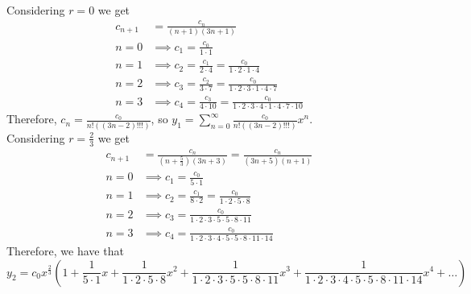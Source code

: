 \documentclass[notes]{subfiles}
\begin{document}
\begin{solution}
\begin{align*}
    \end{align*}
    Considering $r = 0$ we get
    \begin{align*}
        c_{n + 1} &= \frac{c_n}{(n + 1)(3n + 1)} \\
        n = 0 &\implies c_1 = \frac{c_0}{1\cdot 1} \\
        n = 1 &\implies c_2 = \frac{c_1}{2\cdot 4} = \frac{c_0}{1\cdot 2\cdot 1\cdot 4} \\
        n = 2 &\implies c_3 = \frac{c_2}{3\cdot 7} = \frac{c_0}{1\cdot 2\cdot 3\cdot 1\cdot 4\cdot 7} \\
        n = 3 &\implies c_4 = \frac{c_3}{4\cdot 10} = \frac{c_0}{1\cdot 2\cdot 3\cdot 4\cdot 1\cdot 4\cdot 7\cdot 10}
    \end{align*}
    Therefore, $c_n = \frac{c_0}{n!((3n - 2)!!!)}$, so $y_1 = \sum_{n = 0}^\infty \frac{c_0}{n!((3n - 2)!!!)}x^n$. \\
    Considering $r = \frac{2}{3}$ we get
    \begin{align*}
        c_{n + 1} &= \frac{c_n}{(n + \frac{5}{3})(3n + 3)} = \frac{c_n}{(3n + 5)(n + 1)} \\
        n = 0 &\implies c_1 = \frac{c_0}{5\cdot 1} \\
        n = 1 &\implies c_2 = \frac{c_1}{8\cdot 2} = \frac{c_0}{1\cdot 2\cdot 5\cdot 8} \\
        n = 2 &\implies c_3 = \frac{c_0}{1\cdot 2\cdot 3\cdot 5\cdot 5\cdot 8\cdot 11} \\
        n = 3 &\implies c_4 = \frac{c_0}{1\cdot 2\cdot 3\cdot 4\cdot 5\cdot 5\cdot 8\cdot 11\cdot 14}
    \end{align*}
    Therefore, we have that
    \[
        y_2 = c_0x^{\frac{2}{3}}\left( 1 + \frac{1}{5\cdot 1}x + \frac{1}{1\cdot 2\cdot 5\cdot 8}x^2 + \frac{1}{1\cdot 2\cdot 3\cdot 5\cdot 5\cdot 8\cdot 11}x^3 + \frac{1}{1\cdot 2\cdot 3\cdot 4\cdot 5\cdot 5\cdot 8\cdot 11\cdot 14}x^4 + \ldots \right)
    \]
\end{solution}
\end{document}
